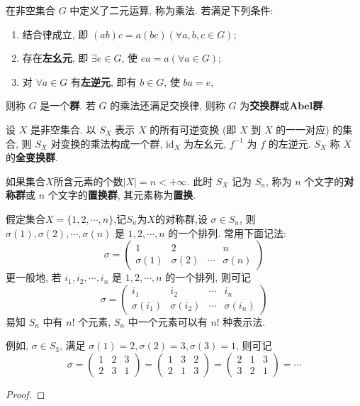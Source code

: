 \documentclass[../../main.tex]{subfiles}
\begin{document}
\begin{definition}[群]
在非空集合 \( G \) 中定义了二元运算, 称为乘法. 若满足下列条件:
\begin{enumerate}[(1)]
\item 结合律成立, 即 \( (ab)c = a(bc) (\forall a,b,c \in G) \);

\item 存在\textbf{左幺元}, 即 \( \exists e \in G \), 使 \( ea = a (\forall a \in G) \);

\item 对 \( \forall a \in G \) 有\textbf{左逆元}, 即有 \( b \in G \), 使 \( ba = e \),
\end{enumerate}
则称 \( G \) 是一个\textbf{群}. 若 \( G \) 的乘法还满足交换律, 则称 \( G \) 为\textbf{交换群}或$\mathbf{Abel}$\textbf{群}.
\end{definition}

\begin{definition}
设 \( X \) 是非空集合. 以 \( S_X \) 表示 \( X \) 的所有可逆变换 (即 \( X \) 到 \( X \) 的一一对应) 的集合, 则 \( S_X \) 对变换的乘法构成一个群, \( \text{id}_X \) 为左幺元, \( f^{-1} \) 为 \( f \) 的左逆元. \( S_X \) 称 \( X \) 的\textbf{全变换群}.

如果集合$X$所含元素的个数\( |X| = n < +\infty \). 此时 \( S_X \) 记为 \( S_n \), 称为 \( n \) 个文字的\textbf{对称群}或 \( n \) 个文字的\textbf{置换群}, 其元素称为\textbf{置换}.
\end{definition}
\begin{remark}
假定集合\( X = \{1, 2, \cdots, n\} \),记$S_n$为$X$的对称群,设 \( \sigma \in S_n \), 则 \( \sigma(1), \sigma(2), \cdots, \sigma(n) \) 是 \( 1, 2, \cdots, n \) 的一个排列. 常用下面记法:
\[
\sigma = \begin{pmatrix} 1 & 2 & & n \\ \sigma(1) & \sigma(2) & \cdots & \sigma(n) \end{pmatrix}
\]
更一般地, 若 \( i_1, i_2, \cdots, i_n \) 是 \( 1, 2, \cdots, n \) 的一个排列, 则可记
\[
\sigma = \begin{pmatrix} i_1 & i_2 & \cdots & i_n \\ \sigma(i_1) & \sigma(i_2) & \cdots & \sigma(i_n) \end{pmatrix}
\]
易知 \( S_n \) 中有 \( n! \) 个元素, \( S_n \) 中一个元素可以有 \( n! \) 种表示法.

例如, \( \sigma \in S_3 \), 满足 \( \sigma(1) = 2, \sigma(2) = 3, \sigma(3) = 1 \), 则可记
\[
\sigma = \begin{pmatrix} 1 & 2 & 3 \\ 2 & 3 & 1 \end{pmatrix} = \begin{pmatrix} 1 & 3 & 2 \\ 2 & 1 & 3 \end{pmatrix} = \begin{pmatrix} 2 & 1 & 3 \\ 3 & 2 & 1 \end{pmatrix} = \cdots
\]
\end{remark}

\begin{definition}

\end{definition}

\begin{theorem}

\end{theorem}
\begin{proof}

\end{proof}
\end{document}

